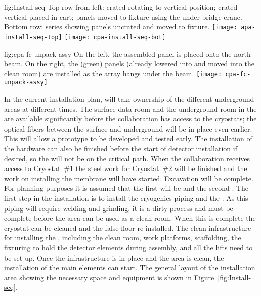 \begin{dunefigure}{fig:Install-seq}
  {Top row from left:  crated  rotating to vertical position;  crated vertical  placed in cart;  panels moved to fixture using the under-bridge crane. Bottom row: series showing  panels uncrated and moved to fixture. }
\texttt{[image: apa-install-seq-top]}
\texttt{[image: cpa-install-seq-bot]}
\end{dunefigure}

\begin{dunefigure}{fig:cpa-fc-unpack-assy}
  {On the left, the assembled  panel is placed onto the north  beam. On the right, the (green)  panels (already lowered into  and moved into the clean room) are installed as the  array hangs under the  beam. }
\texttt{[image: cpa-fc-unpack-assy]}
\end{dunefigure}




In the current installation plan,  will take
ownership of the different underground areas at different times. The
surface data room and the underground room in the  are available
significantly before the collaboration has access to the cryostats; 
the optical fibers between the surface and underground will be in
place even earlier. This will allow a  prototype to be developed
and tested early. The installation of the  hardware can also be
finished before the start of detector installation if desired, so the
 will not be on the critical path.  When the collaboration receives
access to Cryostat~\#1 the steel work for Cryostat~\#2 will be
finished and the work on installing the membrane will have
started. Excavation will be complete.  For planning purposes it is
assumed that the first  will be  and the second
. The first step in the  installation is to
install the cryogenics piping and the . As this piping will
require welding and grinding, it is a dirty process and must be
complete before the area can be used as a clean room. When this is
complete the cryostat can be cleaned and the false floor
re-installed. The clean infrastructure for installing the ,
including the clean room, work platforms, scaffolding, the
fixturing to hold the detector elements during assembly, and all the
lifts need to be set up. Once the infrastructure is in place and the
area is clean, the installation of the main elements can start. The
general layout of the installation area showing the necessary space
and equipment is shown in Figure~\ref{fig:Install-seq}. 

